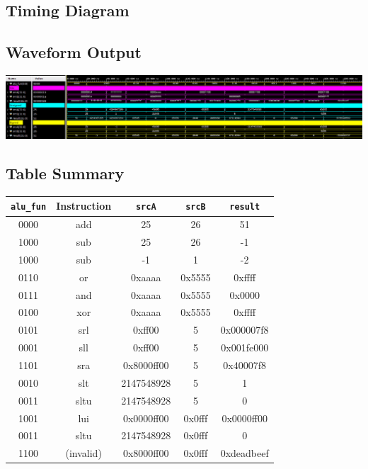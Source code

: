 \documentclass{article}
\begin{document}
\begin{landscape}
\section{Timing Diagram}

\subsection{Waveform Output}
\includegraphics[width=\linewidth]{w.png}

\subsection{Table Summary}

\begin{center}
\begin{tabular}{| c | c | c | c | c |}

    \hline
    \texttt{alu\_fun} & Instruction & \texttt{srcA} & \texttt{srcB} & \texttt{result} \\
    \hline
    0000 & add  & 25 & 26 & 51 \\ 
    1000 & sub  & 25 & 26 & -1 \\ 
    1000 & sub  & -1 & 1 & -2 \\ 
    0110 & or   & 0xaaaa & 0x5555 & 0xffff \\ 
    0111 & and  & 0xaaaa & 0x5555 & 0x0000 \\ 
    0100 & xor  & 0xaaaa & 0x5555 & 0xffff \\ 
    0101 & srl  & 0xff00 & 5 & 0x000007f8 \\ 
    0001 & sll  & 0xff00 & 5 & 0x001fe000 \\ 
    1101 & sra  & 0x8000ff00 & 5 & 0x40007f8 \\ 
    0010 & slt  & 2147548928 & 5 & 1 \\ 
    0011 & sltu & 2147548928 & 5 & 0 \\ 
    1001 & lui  & 0x0000ff00 & 0x0fff & 0x0000ff00 \\ 
    0011 & sltu & 2147548928 & 0x0fff & 0 \\ 
    1100 & (invalid) & 0x8000ff00 & 0x0fff & 0xdeadbeef \\ 
    \hline

\end{tabular}
\end{center}

\end{landscape}

    
\end{document}
